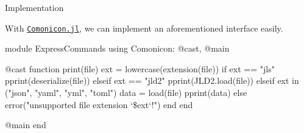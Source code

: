 \begin{frame}[fragile]{Implementation}

    With \href{https://github.com/comonicon/Comonicon.jl}{\texttt{Comonicon.jl}}, we can implement
    an aforementioned interface easily.

    \begin{algorithmblock}
        \begin{juliaverbatim}
            module ExpressCommands
                using Comonicon: @cast, @main

                @cast function print(file)
                    ext = lowercase(extension(file))
                    if ext == "jls"
                        pprint(deserialize(file))
                    elseif ext == "jld2"
                        pprint(JLD2.load(file))
                    elseif ext in ("json", "yaml", "yml", "toml")
                        data = load(file)
                        pprint(data)
                    else
                        error("unsupported file extension `\$ext`!")
                    end
                end

                @main
            end
        \end{juliaverbatim}
    \end{algorithmblock}

\end{frame}
